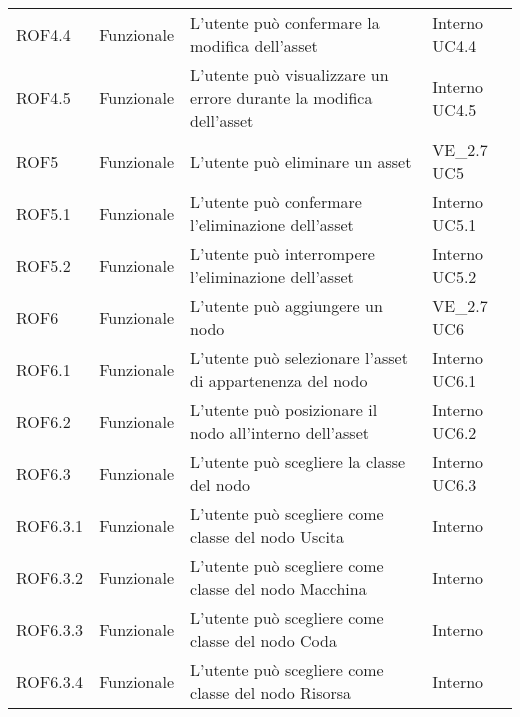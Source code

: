 \begin{longtable}{p{2cm}!{\VRule[1pt]}p{2cm}!{\VRule[1pt]}p{5cm}!{\VRule[1pt]}p{1.5cm}}
ROF4.4&Funzionale\newline  & L'utente può confermare la modifica dell'asset & Interno \newline UC4.4
\\
ROF4.5&Funzionale\newline  & L'utente può visualizzare un errore durante la modifica dell'asset & Interno \newline UC4.5
\\
ROF5&Funzionale\newline  & L'utente può eliminare un asset & VE_2.7 \newline UC5
\\
ROF5.1&Funzionale\newline  & L'utente può confermare l'eliminazione dell'asset & Interno \newline UC5.1
\\
ROF5.2&Funzionale\newline  & L'utente può interrompere l'eliminazione dell'asset & Interno \newline UC5.2
\\
ROF6&Funzionale\newline  & L'utente può aggiungere un nodo & VE_2.7 \newline UC6
\\
ROF6.1&Funzionale\newline  & L'utente può selezionare l'asset di appartenenza del nodo & Interno \newline UC6.1
\\
ROF6.2&Funzionale\newline  & L'utente può posizionare il nodo all'interno dell'asset & Interno \newline UC6.2
\\
ROF6.3&Funzionale\newline  & L'utente può scegliere la classe del nodo & Interno \newline UC6.3
\\
ROF6.3.1&Funzionale\newline  & L'utente può scegliere come classe del nodo Uscita & Interno \\
ROF6.3.2&Funzionale\newline  & L'utente può scegliere come classe del nodo Macchina & Interno \\
ROF6.3.3&Funzionale\newline  & L'utente può scegliere come classe del nodo Coda & Interno \\
ROF6.3.4&Funzionale\newline  & L'utente può scegliere come classe del nodo Risorsa & Interno \\

\end{longtable}
